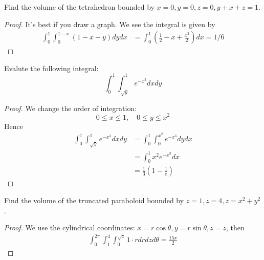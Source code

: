 \documentclass[openany]{book}
\newcommand{\R}{\mathbb{R}}
\begin{document}

\begin{prob}
    Find the volume of the tetrahedron bounded by $x=0, y=0, z=0, y+x+z=1$.
\end{prob}
\begin{proof}
    It's best if you draw a graph. We see the integral is given by 
    \begin{align*}
        \int_0^1\int_0^{1-x}(1-x-y)dydx&=\int_0^1\left(\frac{1}{2}-x+\frac{x^2}{2}\right)dx=1/6
    \end{align*}
\end{proof}





\begin{prob}
    Evalute the following integral:
    \begin{equation*}
        \int_0^1\int_{\sqrt{y}}^1e^{-x^3}dxdy
    \end{equation*}
\end{prob}
\begin{proof}
    We change the order of integration:
    \begin{equation*}
        0\leq x\leq 1, \quad 0\leq y\leq x^2
    \end{equation*}
    Hence 
    \begin{align*}
        \int_0^1\int_{\sqrt{y}}^1e^{-x^3}dxdy&=\int_0^1\int_0^{x^2}e^{-x^3}dydx\\
        &=\int_0^1 x^2e^{-x^3}dx\\
        &=\frac{1}{3}\left(1-\frac{1}{e}\right)
    \end{align*}
\end{proof}



\begin{prob}
    Find the volume of the truncated paraboloid bounded by $z=1, z=4, z=x^2+y^2$.
\end{prob}
\begin{proof}
    We use the cylindrical coordinates: $x=r\cos\theta, y=r\sin\theta, z=z$, then 
    \begin{align*}
        \int_0^{2\pi}\int_1^4\int_0^{\sqrt{z}}1\cdot r drdzd\theta=\frac{15\pi}{2}
    \end{align*} 
\end{proof}
\end{document}
